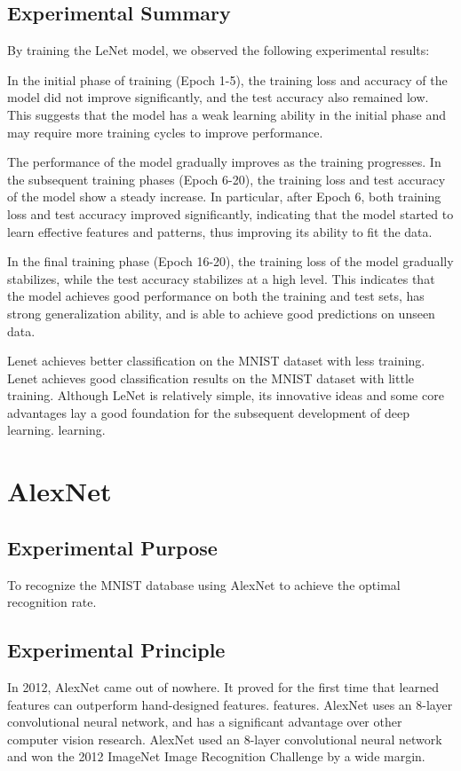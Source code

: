 \documentclass[a4paper,12pt]{article}
\begin{document}
\justifying

\subsection{Experimental Summary}
By training the LeNet model, we observed the following experimental results:

In the initial phase of training (Epoch 1-5), the training loss and accuracy of the model did not improve significantly, and the test accuracy also remained low. This suggests that the model has a weak learning ability in the initial phase and may require more training cycles to improve performance.

The performance of the model gradually improves as the training progresses. In the subsequent training phases (Epoch 6-20), the training loss and test accuracy of the model show a steady increase. In particular, after Epoch 6, both training loss and test accuracy improved significantly, indicating that the model started to learn effective features and patterns, thus improving its ability to fit the data.

In the final training phase (Epoch 16-20), the training loss of the model gradually stabilizes, while the test accuracy stabilizes at a high level. This indicates that the model achieves good performance on both the training and test sets, has strong generalization ability, and is able to achieve good predictions on unseen data.

Lenet achieves better classification on the MNIST dataset with less training.
Lenet achieves good classification results on the MNIST dataset with little training. Although LeNet is relatively simple, its innovative ideas and some core advantages lay a good foundation for the subsequent development of deep learning.
learning.

\newpage
\section{AlexNet}
\subsection{Experimental Purpose}
To recognize the MNIST database using AlexNet to achieve the optimal recognition rate.

\subsection{Experimental Principle}
In 2012, AlexNet came out of nowhere. It proved for the first time that learned features can outperform hand-designed features.
features. AlexNet uses an 8-layer convolutional neural network, and has a significant advantage over other computer vision research.
AlexNet used an 8-layer convolutional neural network and won the 2012 ImageNet Image Recognition Challenge by a wide margin.
\end{document}
